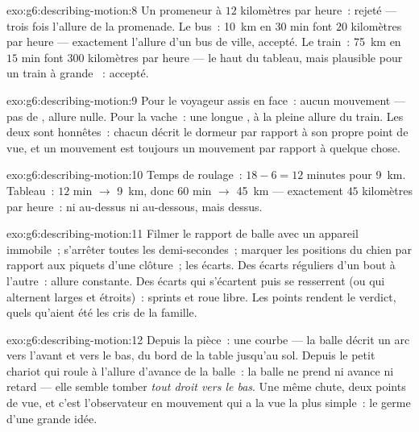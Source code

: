 \begin{solution}{exo:g6:describing-motion:8}
Un promeneur à $12$ kilomètres par heure~: rejeté --- trois fois
l'allure de la promenade. Le bus~: \qty{10}{km} en $30$ min font
$20$ kilomètres par heure --- exactement l'allure d'un bus de ville,
accepté. Le train~: \qty{75}{km} en $15$ min font $300$ kilomètres
par heure --- le haut du tableau, mais plausible pour un train à
grande ~: accepté.
\end{solution}

\begin{solution}{exo:g6:describing-motion:9}
Pour le voyageur assis en face~: aucun mouvement --- pas de
, allure nulle. Pour la vache~: une longue , à la pleine allure du train. Les deux sont honnêtes~:
chacun décrit le dormeur par rapport à son propre point de vue, et
un mouvement est toujours un mouvement par rapport à quelque chose.
\end{solution}

\begin{solution}{exo:g6:describing-motion:10}
Temps de roulage~: $18 - 6 = 12$ minutes pour \qty{9}{km}. Tableau~:
$12$ min $\to$ \qty{9}{km}, donc $60$ min $\to$ \qty{45}{km} ---
exactement $45$ kilomètres par heure~: ni au-dessus ni au-dessous,
mais  dessus.
\end{solution}

\begin{solution}{exo:g6:describing-motion:11}
Filmer le rapport de balle avec un appareil immobile~; s'arrêter
toutes les demi-secondes~; marquer les positions du chien par rapport
aux piquets d'une clôture~;  les écarts. Des écarts réguliers
d'un bout à l'autre~: allure constante. Des écarts qui s'écartent
puis se resserrent (ou qui alternent larges et étroits)~: sprints et
roue libre. Les points rendent le verdict, quels qu'aient été les
cris de la famille.
\end{solution}

\begin{solution}{exo:g6:describing-motion:12}
Depuis la pièce~: une courbe --- la balle décrit un arc vers l'avant
et vers le bas, du bord de la table jusqu'au sol. Depuis le petit
chariot qui roule à l'allure d'avance de la balle~: la balle ne prend
ni avance ni retard --- elle semble tomber \emph{tout droit vers le
bas}. Une même chute, deux points de vue, et c'est l'observateur en
mouvement qui a la vue la plus simple~: le germe d'une grande idée.
\end{solution}

